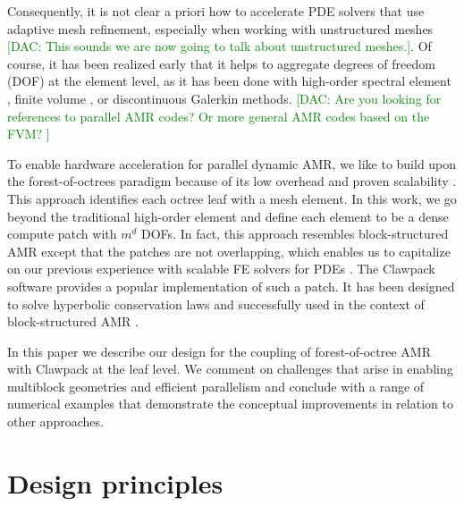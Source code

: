 \documentclass{IOS-Book-Article}     %
\newcommand{\comment}[1]{\textcolor{green}{[DAC: #1]}\xspace}
\begin{document}
Consequently, it is not clear a priori how to accelerate PDE solvers
that use adaptive mesh refinement, especially when working with
unstructured meshes \comment{This sounds we are now going to talk
  about unstructured meshes.}.  Of course, it has been realized early
that it helps to aggregate degrees of freedom (DOF) at the element
level, as it has been done with high-order spectral element
\cite{TufoFischer99}, finite volume
\cite{paramesh, chombo, samrai}, or discontinuous Galerkin
\cite{BursteddeGhattasGurnisEtAl10} methods.
\comment{Are you looking for references to parallel AMR codes?  Or more general AMR codes based on the FVM? }


To enable hardware acceleration for parallel dynamic AMR, we like to
build upon the forest-of-octrees paradigm because of its low overhead
and proven scalability \cite{BursteddeWilcoxGhattas11}.  This approach
identifies each octree leaf with a mesh element.  In this work, we go
beyond the traditional high-order element and define each element to
be a dense compute patch with $m^d$ DOFs.  In fact, this approach
resembles block-structured AMR \cite{be-ol:1984, be-co:1989, be-le:1991,
ColellaGravesKeenEtAl07} except that the
patches are not overlapping, which enables us to capitalize on our
previous experience with scalable FE solvers for PDEs
\cite{BursteddeStadlerAlisicEtAl13}.  The Clawpack software
\cite{LeVeque97} provides a popular implementation of such a patch.
It has been designed to solve hyperbolic conservation laws
and successfully used in the context of block-structured AMR
\cite{be-le:1991, amrclaw}.

In this paper we describe our design for the coupling of forest-of-octree AMR
with Clawpack at the leaf level.  We comment on challenges that arise in
enabling multiblock geometries and efficient parallelism and conclude with a range
of numerical examples that demonstrate the conceptual improvements in relation
to other approaches.

\section{Design principles}
\end{document}
